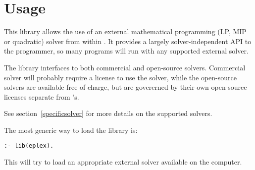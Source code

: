 %
% 
% 
% 
% 


\section{Usage}
This library allows the use of an external mathematical programming 
(LP, MIP or quadratic) solver 
from within {\eclipse}. It provides a largely solver-independent API
to the programmer, so many programs will run with any supported external
solver.

The library interfaces to both commercial and open-source
solvers. Commercial solver will probably require a license to use the
solver, while the open-source solvers are available free of charge, but are
govererned by their own open-source licenses separate from {\eclipse}'s.


See section~\ref{specificsolver} for more details on the supported solvers.

The most generic way to load the library is:
\begin{verbatim}
:- lib(eplex).
\end{verbatim}
This will try to load an appropriate external solver available on
the computer.

